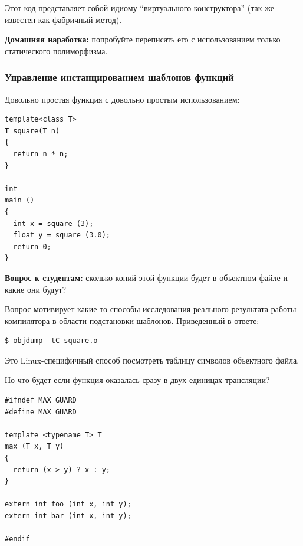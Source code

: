 \documentclass[a4paper,12pt,oneside]{article}
\newif\ifanswers
\begin{document}
Этот код представляет собой идиому ``виртуального конструктора'' (так же известен как фабричный метод).

\textbf{Домашняя наработка:} попробуйте переписать его с использованием только статического полиморфизма.

\subsubsection{Управление инстанцированием шаблонов функций}\label{InstancingFuncs}

Довольно простая функция с довольно простым использованием:

\begin{lstlisting}
template<class T>
T square(T n)
{
  return n * n;
}

int
main ()
{
  int x = square (3);
  float y = square (3.0);
  return 0;
}
\end{lstlisting}

\textbf{Вопрос к студентам:} сколько копий этой функции будет в объектном файле и какие они будут?

\ifanswers
В вопросе конечно есть подвох:

\begin{verbatim}
$ g++ -c square.cc
$ objdump -tC square.o
\end{verbatim}

даёт 

\begin{verbatim}
_Z6squareIiET_S0_
_Z6squareIdET_S0_ 
\end{verbatim}

Что соответствует:

\begin{lstlisting}
int square<int>(int);
double square<double>(double);
\end{lstlisting}
\fi

Вопрос мотивирует какие-то способы исследования реального результата работы компилятора в области подстановки шаблонов. Приведенный в ответе:

\begin{verbatim}
$ objdump -tC square.o
\end{verbatim}

Это Linux-специфичный способ посмотреть таблицу символов объектного файла.

Но что будет если функция оказалась сразу в двух единицах трансляции?

\begin{lstlisting}
#ifndef MAX_GUARD_
#define MAX_GUARD_

template <typename T> T
max (T x, T y)
{
  return (x > y) ? x : y;
}

extern int foo (int x, int y);
extern int bar (int x, int y);

#endif
\end{lstlisting}
\end{document}
